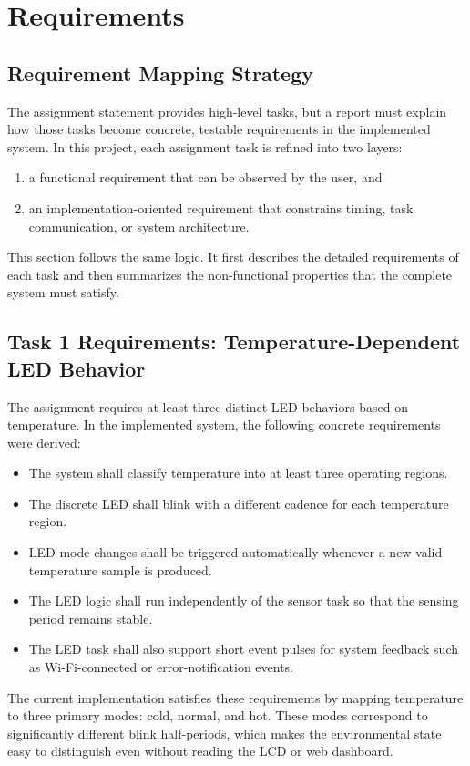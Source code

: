 \section{Requirements}

\subsection{Requirement Mapping Strategy}
The assignment statement provides high-level tasks, but a report must explain
how those tasks become concrete, testable requirements in the implemented
system. In this project, each assignment task is refined into two layers:
\begin{enumerate}
  \item a functional requirement that can be observed by the user, and
  \item an implementation-oriented requirement that constrains timing, task
  communication, or system architecture.
\end{enumerate}
This section follows the same logic. It first describes the detailed
requirements of each task and then summarizes the non-functional properties that
the complete system must satisfy.

\subsection{Task 1 Requirements: Temperature-Dependent LED Behavior}
The assignment requires at least three distinct LED behaviors based on
temperature. In the implemented system, the following concrete requirements were
derived:
\begin{itemize}
  \item The system shall classify temperature into at least three operating
  regions.
  \item The discrete LED shall blink with a different cadence for each
  temperature region.
  \item LED mode changes shall be triggered automatically whenever a new valid
  temperature sample is produced.
  \item The LED logic shall run independently of the sensor task so that the
  sensing period remains stable.
  \item The LED task shall also support short event pulses for system feedback
  such as Wi-Fi-connected or error-notification events.
\end{itemize}

The current implementation satisfies these requirements by mapping temperature
to three primary modes: cold, normal, and hot. These modes correspond to
significantly different blink half-periods, which makes the environmental state
easy to distinguish even without reading the LCD or web dashboard.

